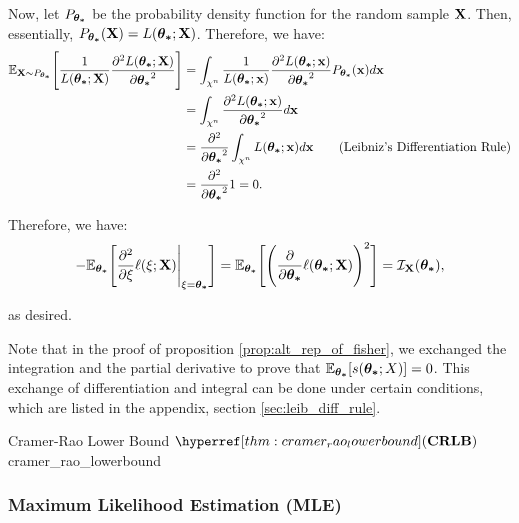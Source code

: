 \begin{proof*}
    \noindent Now, let $P_{\boldsymbol{\theta_*}}$ be the probability density function for the random sample ${\bf X}$. Then, essentially, $P_{\boldsymbol{\theta_*}}({\bf X}) = L(\boldsymbol{\theta_*};{\bf X})$. Therefore, we have:
    \begin{align*}
        \mathbb{E}_{{\bf X}\sim P_{\boldsymbol{\theta_*}}} \Bigg[ \frac{1}{L(\boldsymbol{\theta_*};{\bf X})}\frac{\partial^2 L(\boldsymbol{\theta_*};{\bf X})}{\partial\boldsymbol{\theta_*}^2} \Bigg] &= \int_{\chi^n} \frac{1}{L(\boldsymbol{\theta_*};{\bf x})}\frac{\partial^2 L(\boldsymbol{\theta_*};{\bf x})}{\partial\boldsymbol{\theta_*}^2} P_{\boldsymbol{\theta_*}}({\bf x}) d{\bf x} \\
        &= \int_{\chi^n}\frac{\partial^2 L(\boldsymbol{\theta_*};{\bf x})}{\partial\boldsymbol{\theta_*}^2} d{\bf x} \\
        &= \frac{\partial^2}{\partial\boldsymbol{\theta_*}^2}\int_{\chi^n} L(\boldsymbol{\theta_*};{\bf x})d{\bf x} \qquad \text{(Leibniz's Differentiation Rule)} \\
        &= \frac{\partial^2}{\partial\boldsymbol{\theta_*}^2} 1 = 0.
    \end{align*} 

    \noindent Therefore, we have:
    \begin{align*}
        -\mathbb{E}_{\boldsymbol{\theta_*}}\Bigg[ \frac{\partial^2}{\partial\xi}\ell(\xi;{\bf X})\Bigg|_{\xi=\boldsymbol{\theta_*}} \Bigg] = \mathbb{E}_{\boldsymbol{\theta_*}}\Bigg[ \Bigg( \frac{\partial}{\partial\boldsymbol{\theta_*}}\ell(\boldsymbol{\theta_*};{\bf X}) \Bigg)^2 \Bigg] = \mathcal{I}_{{\bf X}}(\boldsymbol{\theta_*}),
    \end{align*} 

    as desired.
\end{proof*} 

\begin{remark}
    Note that in the proof of proposition \ref{prop:alt_rep_of_fisher}, we exchanged the integration and the partial derivative to prove that $\mathbb{E}_{\boldsymbol{\theta_*}}[s(\boldsymbol{\theta_*};X)]=0$. This exchange of differentiation and integral can be done under certain conditions, which are listed in the appendix, section \ref{sec:leib_diff_rule}.
\end{remark}

\begin{theorem}{Cramer-Rao Lower Bound $\CRLB$}{cramer_rao_lowerbound}

\end{theorem}


\subsubsection{Maximum Likelihood Estimation (MLE)}


